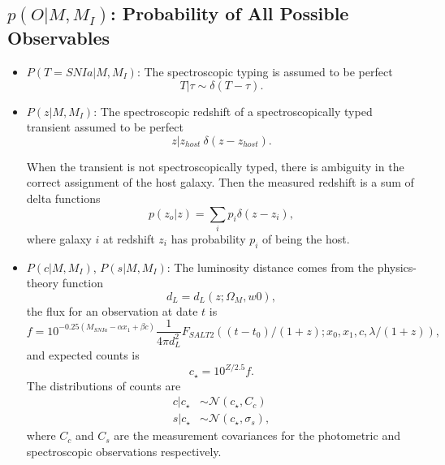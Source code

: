 \documentclass[preprint,3p]{elsarticle}
\begin{document}
\subsection{$p(O| M, M_I)$: Probability of All Possible Observables}
\begin{itemize}
\item $P(T=SNIa| M, M_I) $: The spectroscopic typing is assumed to be perfect
\begin{equation}
T | \tau \sim \delta (T-\tau).
\label{typepdf:eqn}
\end{equation}

\item $P(z| M, M_I) $: The spectroscopic redshift of a spectroscopically typed transient assumed to be perfect
\begin{equation}
z | z_{host} ~ \delta (z-z_{host}).
\end{equation}

When the transient is not spectroscopically typed, there is ambiguity in the correct assignment of the host galaxy.
Then the measured redshift is a sum of delta functions
\begin{equation}
p(z_o|z) = \sum_i p_i \delta(z-z_i),
\end{equation}
where galaxy $i$ at
redshift $z_i$ has probability $p_i$ of being
the host.  

\item  $P(c| M, M_I)$, $P(s| M, M_I)$:
The luminosity distance comes from the physics-theory function
\begin{equation}
d_L = d_L(z; \Omega_M, w0),
\end{equation}
the flux for an observation at date $t$ is
\begin{equation}
f = 10^{-0.25 \left(M_{SNIa} - \alpha x_1 + \beta c \right)}\frac{1}{4\pi d_L^2} F_{SALT2}((t-t_0)/(1+z); x_0,  x_1, c, \lambda/(1+z)),
\end{equation}
and expected counts is
\begin{equation}
c_\star = 10^{Z/2.5}f.
\end{equation}
The distributions of counts are 
\begin{align}
c | c_\star &\sim \mathcal{N}(c_\star, C_c)\\
s | c_\star &\sim \mathcal{N}(c_\star, \sigma_s),
\end{align}
where $C_c$ and $C_s$ are the measurement covariances for the photometric and spectroscopic observations respectively.

\end{itemize}
\end{document}
